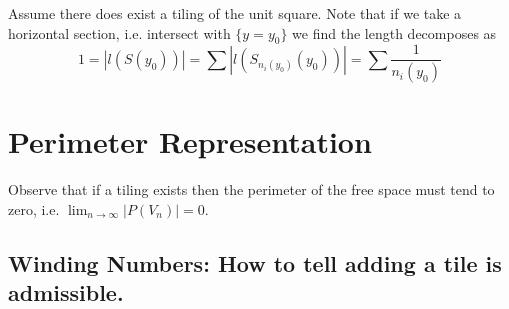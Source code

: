 \documentclass[11pt]{article}
\theoremstyle{plain}%
\theoremstyle{definition}
\theoremstyle{remark}
\numberwithin{equation}{section}
\begin{document}
Assume there does exist a tiling of the unit square. 
Note that if we take a horizontal section, i.e. intersect with $\{y=y_0\}$ we find the length decomposes as
\begin{equation}
1=|l(S(y_0))|=\sum |l(S_{n_i(y_0)}(y_0))|=\sum\frac{1}{n_i(y_0)}
\end{equation}

\section{Perimeter Representation}
Observe that if a tiling exists then the perimeter of the free space must tend to zero, i.e. $\lim_{n\to \infty}|P(V_n)|=0$.

\subsection{Winding Numbers: How to tell adding a tile is admissible.}

\newpage
\begin{appendix}

\end{appendix}

\small
{}


\end{document}
